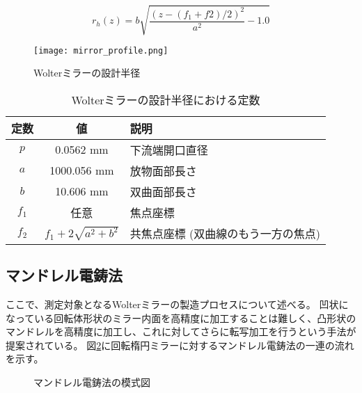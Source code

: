 \begin{equation}
    r_h(z) = b \sqrt{ \frac{(z - (f_1 + f2) / 2)^2}{a^2} - 1.0 }
\end{equation}

\begin{figure}[h]
\centering
\texttt{[image: mirror\_profile.png]}
\caption{Wolterミラーの設計半径}
\label{fig:wolter_profile}
\end{figure}

\begin{table}[htb]
    \begin{center}
      \begin{tabular}{|c|c|l|} \hline
        定数 & 値 & 説明 \\ \hline
        $p$ & 0.0562 mm & 下流端開口直径 \\
        $a$ & 1000.056 mm & 放物面部長さ \\
        $b$ & 10.606 mm & 双曲面部長さ \\ 
        $f_1$ & 任意 & 焦点座標 \\
        $f_2$ & $f_1 + 2 \sqrt{ a^2 + b^2 }$  & 共焦点座標 (双曲線のもう一方の焦点) \\\hline
      \end{tabular}
      \caption{Wolterミラーの設計半径における定数}
      \label{tb:wolter_profile_constants}
    \end{center}
\end{table}


\subsection{マンドレル電鋳法}
\label{chap1_mirror_mandrel}

ここで、測定対象となるWolterミラーの製造プロセスについて述べる。
凹状になっている回転体形状のミラー内面を高精度に加工することは難しく、凸形状のマンドレルを高精度に加工し、これに対してさらに転写加工を行うという手法が提案されている。\cite{Mimura2018}
図\ref{fig:mandrel_plating_pictures}に回転楕円ミラーに対するマンドレル電鋳法の一連の流れを示す。

\begin{figure}[!ht]
\centering
{}
\caption[]{マンドレル電鋳法の模式図}
\label{fig:mandrel_plating_pictures}
\end{figure}

